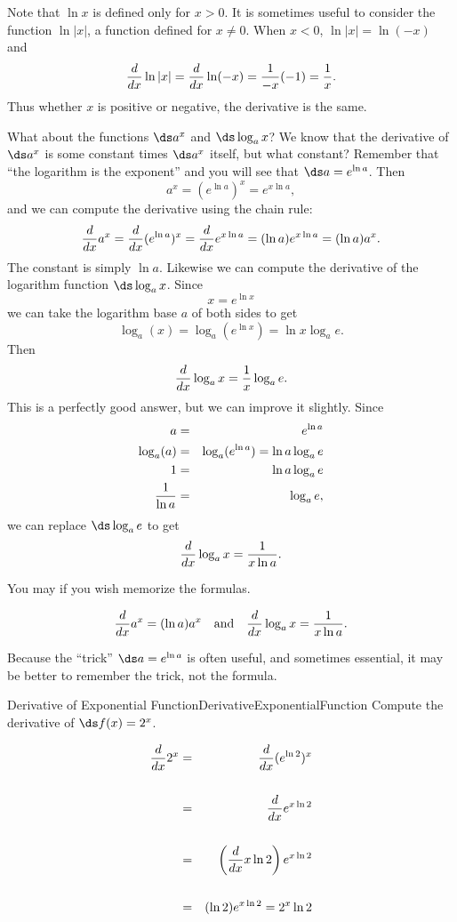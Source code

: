 Note that $\ln x$ is defined only for $x>0$. It is sometimes useful to
consider the function $\ln |x|$, a function defined for
$x\not=0$. When $x<0$, $\ln |x|=\ln(-x)$ and 
$${d\over dx}\ln |x|={d\over dx}\ln (-x)={1\over -x}(-1)={1\over x}.$$
Thus whether $x$ is positive or negative, the derivative is the same.

What about the functions $\ds a^x$ and $\ds \log_a x$? We know that the
derivative of $\ds a^x$ is some constant times $\ds a^x$ itself, but what
constant? Remember that ``the logarithm is the exponent'' and you will
see that $\ds a=e^{\ln a}$. Then
$$a^x = (e^{\ln a})^x = e^{x\ln a},$$
and we can compute the derivative using the chain rule:
$${d\over dx} a^x = {d\over dx}(e^{\ln a})^x = {d\over dx}e^{x\ln a} = 
(\ln a)e^{x\ln a} =(\ln a)a^x.$$
The constant is simply $\ln a$. Likewise we can compute the derivative
of the logarithm function $\ds \log_a x$. Since
$$x=e^{\ln x}$$
we can take the logarithm base $a$ of both sides to get
$$
\log_a(x)=\log_a(e^{\ln x})=\ln x \log_a e.
$$
Then
$${d\over dx}\log_a x = {1\over x}\log_a e.$$
This is a perfectly good answer, but we can improve it slightly.
Since 
\begin{eqnarray*}
a&=&e^{\ln a}\cr
\log_a(a) &=& \log_a(e^{\ln a}) = \ln a\log_a e\cr
1&=&\ln a\log_a e\cr
{1\over \ln a}&=&\log_a e,\cr
\end{eqnarray*}
we can replace $\ds \log_a e$ to get
$${d\over dx}\log_a x = {1\over x\ln a}.$$

You may if you wish memorize the formulas.

\begin{formulabox}
$${d\over dx}a^x = (\ln a)a^x \quad \hbox{and}\quad
{d\over dx}\log_a x = {1\over x\ln a}.$$
\end{formulabox}

Because the ``trick'' $\ds a=e^{\ln a}$ is often useful, and sometimes
essential, it may be better to remember the trick, not the formula.

\begin{example}{Derivative of Exponential Function}{DerivativeExponentialFunction}
Compute the derivative of $\ds f(x)=2^x$.
\end{example}

\begin{solution} 
\begin{eqnarray*}
{d\over dx}2^{x} &=& {d\over dx}(e^{\ln 2})^x\\
\\
&=& {d\over dx}e^{x\ln 2}\\
\\
&=& \left({d\over dx} x\ln 2\right) e^{x\ln 2}\\
\\
&=& (\ln 2)  e^{x\ln 2}=2^x\ln2
\end{eqnarray*}\vspace{-0.2cm}
\end{solution}

